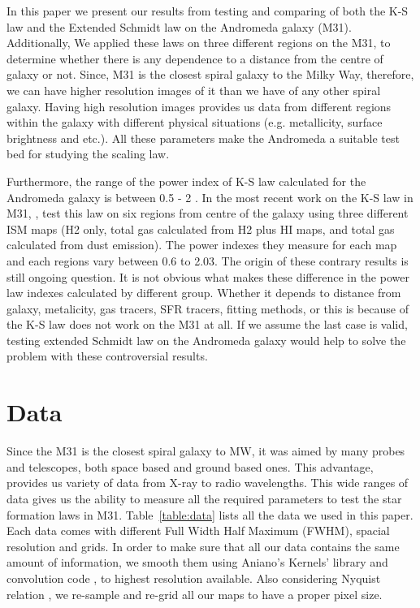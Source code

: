 \documentclass[useAMS,usenatbib]{mn2e}
\begin{document}
In this paper we present our results from testing and comparing of both the K-S law and the Extended Schmidt law on the Andromeda galaxy (M31). %
Additionally, We applied these laws on three different regions on the M31, to determine whether there is any dependence to a distance from the centre of galaxy or not. Since, M31 is the closest spiral galaxy to the Milky Way, therefore, we can have higher resolution images of it than we have of any other spiral galaxy. Having high resolution images provides us data from different regions within
the galaxy with different physical situations (e.g. metallicity, surface brightness and etc.). All these parameters make the Andromeda a suitable test bed for studying the scaling law.

Furthermore, the range of the power index of K-S law calculated for the Andromeda galaxy is between 0.5 - 2 \citep[e.g.,][]{Tabatabaei10,Ford13}. %
In the most recent work on the K-S law in M31, \cite{Ford13}, test this law on six regions from centre of the galaxy using three different ISM maps (H2 only, total gas calculated from H2 plus HI maps, and total gas calculated from dust emission). The power indexes they measure for each map and each regions vary between 0.6 to 2.03. The origin of these contrary results is still ongoing question. It is not obvious what makes these difference in the power law indexes calculated by different group. Whether it depends to distance from galaxy, metalicity, gas tracers, SFR tracers, fitting methods, or this is because of the K-S law does not work on the M31 at all. If we assume the last case is valid, testing extended Schmidt law on the Andromeda galaxy would help to solve the problem with these controversial results.


\section{Data}
\label{sec:data}
Since the M31 is the closest spiral galaxy to MW, it was aimed by many probes and telescopes, both space based and ground based ones. This advantage, provides us variety of data from X-ray to radio wavelengths. This wide ranges of data gives us the ability to measure all the required parameters to test the star formation laws in M31. Table~\ref{table:data} lists all the data we used in this paper. Each data comes with different Full Width Half Maximum (FWHM), spacial resolution and grids. In order to make sure that all our data contains the same amount of information, we smooth them using Aniano's Kernels' library and convolution code \citep{Aniano12}, to highest resolution available. Also considering Nyquist relation \citep{Nyquist}, we re-sample and re-grid all our maps to have a proper pixel size.
\end{document}
